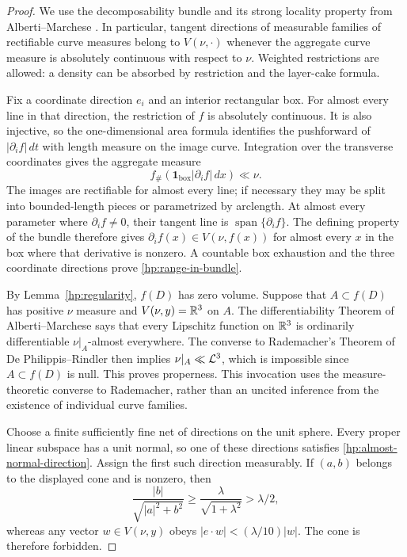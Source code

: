 \begin{proof}
We use the decomposability bundle and its strong locality property
from Alberti--Marchese \cite[Section~2.6 and Proposition~2.9(i)]
{AlbertiMarchese2016}.  In particular, tangent directions of measurable
families of rectifiable curve measures belong to $V(\nu,\cdot)$
whenever the aggregate curve measure is absolutely continuous with
respect to $\nu$.  Weighted restrictions are allowed: a density can
be absorbed by restriction and the layer-cake formula.

Fix a coordinate direction $e_i$ and an interior rectangular box.
For almost every line in that direction, the restriction of $f$ is
absolutely continuous.  It is also injective, so the one-dimensional
area formula identifies the pushforward of
$|\partial_i f|\,dt$ with length measure on the image curve.
Integration over the transverse coordinates gives the aggregate
measure
\[
 f_\#(\mathbf1_{\text{box}}|\partial_i f|\,dx)\ll\nu.
\]
The images are rectifiable for almost every line; if necessary they
may be split into bounded-length pieces or parametrized by arclength.
At almost every parameter where $\partial_i f\ne0$, their tangent
line is $\operatorname{span}\{\partial_i f\}$.  The defining property
of the bundle therefore gives
$\partial_i f(x)\in V(\nu,f(x))$ for almost every $x$ in the box
where that derivative is nonzero.  A countable box exhaustion and the
three coordinate directions prove \eqref{hp:range-in-bundle}.

By Lemma~\ref{hp:regularity}, $f(D)$ has zero volume.  Suppose that
$A\subset f(D)$ has positive $\nu$ measure and
$V(\nu,y)=\mathbb R^3$ on $A$.  The differentiability Theorem of
Alberti--Marchese \cite[Theorem~1.1(i)]{AlbertiMarchese2016} says that
every Lipschitz function on $\mathbb R^3$ is ordinarily differentiable
$\nu\vert_A$-almost everywhere.  The converse to Rademacher's Theorem
of De Philippis--Rindler \cite[Theorem~1.14]{DePhilippisRindler2016}
then implies $\nu\vert_A\ll\mathcal L^3$, which is impossible since
$A\subset f(D)$ is null.  This proves properness.  This invocation
uses the measure-theoretic converse to Rademacher, rather than an
uncited inference from the existence of individual curve families.

Choose a finite sufficiently fine net of directions on the unit
sphere.  Every proper linear subspace has a unit normal, so one
of these directions satisfies \eqref{hp:almost-normal-direction}.
Assign the first such direction measurably.  If $(a,b)$ belongs to
the displayed cone and is nonzero, then
\[
 \frac{|b|}{\sqrt{|a|^2+b^2}}
 \ge\frac{\lambda}{\sqrt{1+\lambda^2}}>\lambda/2,
\]
whereas any vector $w\in V(\nu,y)$ obeys
$|e\cdot w|< (\lambda/10)|w|$.  The cone is therefore forbidden.
\end{proof}

